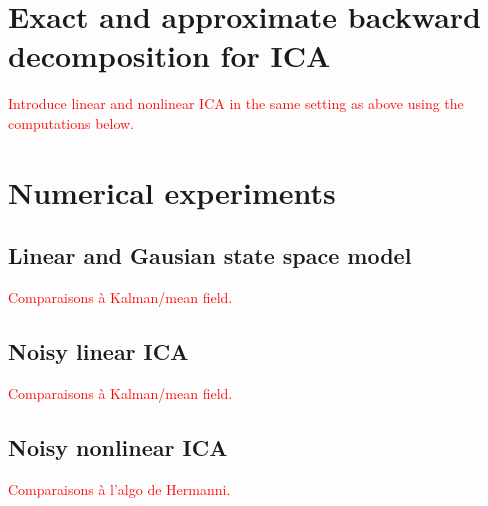 \documentclass{article}
\newcommand{\1}{\mathbbm{1}}
\begin{document}
\section{Exact and approximate backward decomposition for ICA}
\textcolor{red}{Introduce linear and nonlinear ICA in the same setting as above using the computations below.}

\section{Numerical experiments}
\subsection{Linear and Gausian state space model}
\textcolor{red}{Comparaisons \`a Kalman/mean field.}
\subsection{Noisy linear ICA}
\textcolor{red}{Comparaisons \`a Kalman/mean field.} 
\subsection{Noisy nonlinear ICA}
\textcolor{red}{Comparaisons \`a l'algo de Hermanni.}

\clearpage
\newpage
\end{document}
